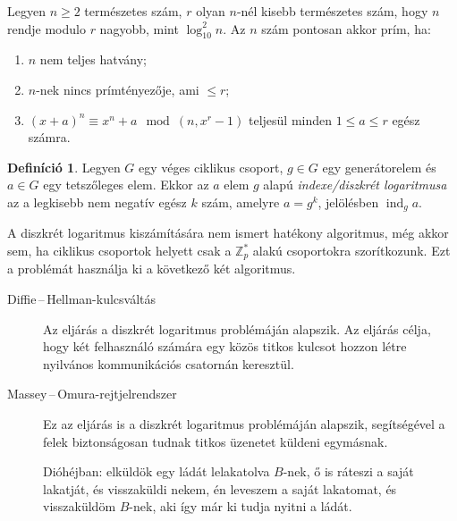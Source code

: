 \documentclass[DIV=15,appendixprefix]{scrreprt}
\theoremstyle{definition}
\newtheorem*{defin}{Definíció}
\theoremstyle{remark}
\DeclareMathOperator{\ind}{ind}
\begin{document}
\begin{description}
		Legyen $ n \ge 2 $ természetes szám, $ r $ olyan $ n $-nél kisebb természetes szám, hogy
		$ n $ rendje modulo $ r $ nagyobb, mint $ \log_{ 10 }^{ 2 } n $. Az $ n $ szám pontosan
		akkor prím, ha:
		\begin{enumerate}
		\item $ n $ nem teljes hatvány;
		\item $ n $-nek nincs prímtényezője, ami $ \le r $;
		\item $ \left( x + a \right)^{ n } \equiv x^{ n } + a \mod{ \left( n, x^{ r } - 1
			\right) } $ teljesül minden $ 1 \le a \le r $ egész számra.
		\end{enumerate}
\end{description}
%
\begin{defin}
	Legyen $G$ egy véges ciklikus csoport, $ g \in G $ egy generátorelem és $ a \in G $ egy
	tetszőleges elem. Ekkor az $ a $ elem $ g $ alapú \emph{indexe/diszkrét logaritmusa} az a
	legkisebb nem negatív egész $ k $ szám, amelyre $ a = g^{ k }$, jelölésben $ \ind_{ g } a $.
\end{defin}
A diszkrét logaritmus kiszámítására nem ismert hatékony algoritmus, még akkor sem, ha ciklikus
csoportok helyett csak a $ \mathbb{ Z }_{ p }^{ * } $ alakú csoportokra szorítkozunk. Ezt a
problémát használja ki a következő két algoritmus.
\begin{description}
	\item[Diffie\,--\,Hellman-kulcsváltás] Az eljárás a diszkrét logaritmus problémáján alapszik. Az
		eljárás célja, hogy két felhasználó számára egy közös titkos kulcsot hozzon létre nyilvános
		kommunikációs csatornán keresztül.

	\item[Massey\,--\,Omura-rejtjelrendszer] Ez az eljárás is a diszkrét logaritmus problémáján
		alapszik, segítségével a felek biztonságosan tudnak titkos üzenetet küldeni egymásnak.

		Dióhéjban: elküldök egy ládát lelakatolva $ B $-nek, ő is ráteszi a saját lakatját,
		és visszaküldi nekem, én leveszem a saját lakatomat, és visszaküldöm $ B $-nek, aki így
		már ki tudja nyitni a ládát.
\end{description}
%
\end{document}
